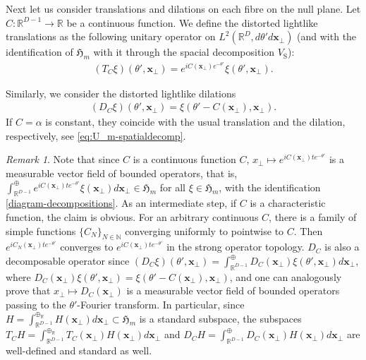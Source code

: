 \documentclass[12pt]{article}
\def\RR{{\mathbb R}}
\def\NN{{\mathbb N}}
\def\hm{\mathfrak{H}_m}
\def\tx{\pmb{x}}
\theoremstyle{remark}
\newtheorem{remark}[theorem]{Remark}
\begin{document}
Next let us consider translations and dilations on each fibre on the null plane.
Let $C:\RR^{D-1}\to\RR$ be a continuous function.
We define the distorted lightlike translations as the following unitary operator on $ L^2(\RR^D ,d\theta'd\pmb{x}_\perp)$
(and with the identification of $\hm$ with it through the spacial decomposition $V_{\mathrm S}$):
   \begin{align}\label{eq:non-const-translation}
    (T_C \xi)(\theta',\pmb{x}_\perp) = e^{iC(\pmb{x}_\perp)e^{-\theta'}} \xi(\theta', \pmb{x}_\perp).
   \end{align}

Similarly, we consider the distorted lightlike dilations
   \begin{align}\label{eq:non-const-dilations}
    (D_C\xi)(\theta', \pmb{x}_\perp) = \xi(\theta' - C(\pmb{x}_\perp), \pmb{x}_\perp).
   \end{align}
If $C = \alpha$ is constant, they coincide with the usual translation and the dilation, respectively, see \eqref{eq:U_m-spatialdecomp}.

\begin{remark}\label{rem:TCDC}Note that since $C$ is a continuous function $C$, $x_\perp\mapsto  e^{iC(\pmb{x}_\perp)te^{-\theta'}}$ is a measurable vector field of bounded operators,
that is, $\int_{\RR^{D-1}}^\oplus e^{iC(\pmb{x}_\perp)te^{-\theta'}}\xi(\pmb{x}_\perp)d\pmb x_\perp\in\hm$ for all $\xi\in\hm$, with the identification \eqref{diagram-decompositions}.
As an intermediate step, if $C$ is a characteristic function, the claim is obvious.
For an arbitrary continuous $C$, there is a family of simple functions $\{C_N\}_{N\in\NN}$ converging  uniformly to pointwise to $C$.
 Then $e^{iC_N(\pmb{x}_\perp)te^{-\theta'}}$ converges to $e^{iC(\pmb{x}_\perp)te^{-\theta'}}$ in the strong operator topology. 
 $D_C$ is also a decomposable operator since
  $(D_C\xi)(\theta',\tx_\perp)=\int_{\RR^{D-1}}^\oplus D_C(\tx_\perp) \xi(\theta',\tx_\perp)d\tx_\perp$,
 where $D_C(\tx_\perp) \xi(\theta',\tx_\perp)= \xi(\theta' - C(\pmb{x}_\perp), \pmb{x}_\perp)$,
 and one can analogously prove that $x_\perp\mapsto  D_C(\tx_\perp)$ is a measurable vector field of bounded operators passing to the $\theta'$-Fourier transform. In particular, since $H=\int_{\RR^{D-1}}^{\oplus_\RR} H(\tx_\perp)d\tx_\perp\subset\hm$ is a standard subspace,
 the subspaces $T_C H=\int_{\RR^{D-1}}^{\oplus_\RR} T_C(\tx_\perp)H(\tx_\perp)d\tx_\perp$ and $D_CH=\int_{\RR^{D-1}}^\oplus D_C(\tx_\perp)H(\tx_\perp)d\tx_\perp$
 are well-defined and standard as well.
\end{remark}
 
\end{document}
